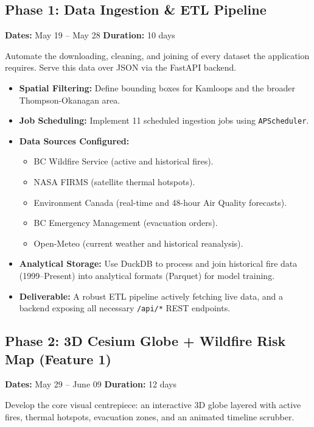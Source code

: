 \documentclass[12pt,letterpaper]{article}
\begin{document}
\subsection*{Phase 1: Data Ingestion \& ETL Pipeline}
\textbf{Dates:} May 19 -- May 28 \hfill \textbf{Duration:} 10 days

\begin{goalbox}
Automate the downloading, cleaning, and joining of every dataset the application requires. Serve this data over JSON via the FastAPI backend.
\end{goalbox}

\begin{itemize}
    \item \textbf{Spatial Filtering:} Define bounding boxes for Kamloops and the broader Thompson-Okanagan area.
    \item \textbf{Job Scheduling:} Implement 11 scheduled ingestion jobs using \texttt{APScheduler}.
    \item \textbf{Data Sources Configured:}
    \begin{itemize}
        \item BC Wildfire Service (active and historical fires).
        \item NASA FIRMS (satellite thermal hotspots).
        \item Environment Canada (real-time and 48-hour Air Quality forecasts).
        \item BC Emergency Management (evacuation orders).
        \item Open-Meteo (current weather and historical reanalysis).
    \end{itemize}
    \item \textbf{Analytical Storage:} Use DuckDB to process and join historical fire data (1999--Present) into analytical formats (Parquet) for model training.
    \item \textbf{Deliverable:} A robust ETL pipeline actively fetching live data, and a backend exposing all necessary \texttt{/api/*} REST endpoints.
\end{itemize}

\subsection*{Phase 2: 3D Cesium Globe + Wildfire Risk Map (Feature 1)}
\textbf{Dates:} May 29 -- June 09 \hfill \textbf{Duration:} 12 days

\begin{goalbox}
Develop the core visual centrepiece: an interactive 3D globe layered with active fires, thermal hotspots, evacuation zones, and an animated timeline scrubber.
\end{goalbox}
\end{document}
